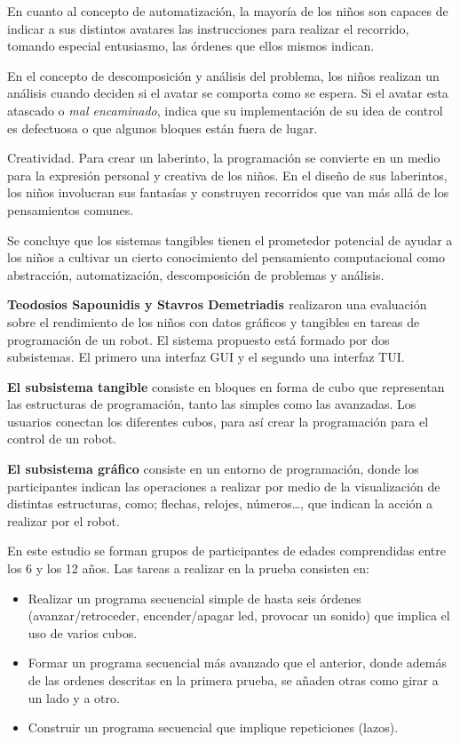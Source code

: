 En cuanto al concepto de automatización, la mayoría de los niños son capaces de indicar a sus distintos avatares las instrucciones para realizar el recorrido, tomando especial entusiasmo, las órdenes que ellos mismos indican.

En el concepto de descomposición y análisis del problema, los niños realizan un análisis cuando deciden si el avatar se comporta como se espera. Si el avatar esta atascado o \emph{mal encaminado}, indica que su implementación de su idea de control es defectuosa o que algunos bloques están fuera de lugar. 

Creatividad. Para crear un laberinto, la programación se convierte en un medio para la expresión personal y creativa de los niños. En el diseño de sus laberintos, los niños involucran sus fantasías y construyen recorridos que van más allá de los pensamientos comunes.

Se concluye que los sistemas tangibles tienen el prometedor potencial de ayudar a los niños a cultivar un cierto conocimiento del pensamiento computacional como abstracción, automatización, descomposición de problemas y análisis.


\textbf{Teodosios Sapounidis y Stavros Demetriadis \cite{Sapounidis}} realizaron una evaluación sobre el rendimiento de los niños con datos gráficos y tangibles en tareas de programación de un robot. El sistema propuesto está formado por dos subsistemas. El primero una interfaz GUI y el segundo una interfaz TUI.

\textbf{El subsistema tangible} consiste en bloques en forma de cubo que representan las estructuras de programación, tanto las simples como las avanzadas. Los usuarios conectan los diferentes cubos, para así crear la programación para el control de un robot.

\textbf{El subsistema gráfico} consiste en un entorno de programación, donde los participantes indican las operaciones a realizar por medio de la visualización de distintas estructuras, como; flechas, relojes, números…, que indican la acción a realizar por el robot.

En este estudio se forman grupos de participantes de edades comprendidas entre los 6 y los 12 años.
Las tareas a realizar en la prueba consisten en:
\begin{itemize}
\item Realizar un programa secuencial simple de hasta seis órdenes (avanzar/retroceder, encender/apagar led, provocar un sonido) que implica el uso de varios cubos.

\item Formar un programa secuencial más avanzado que el anterior, donde además de las ordenes descritas en la primera prueba, se añaden otras como girar a un lado y a otro.

\item Construir un programa secuencial que implique repeticiones (lazos).
\end{itemize}

